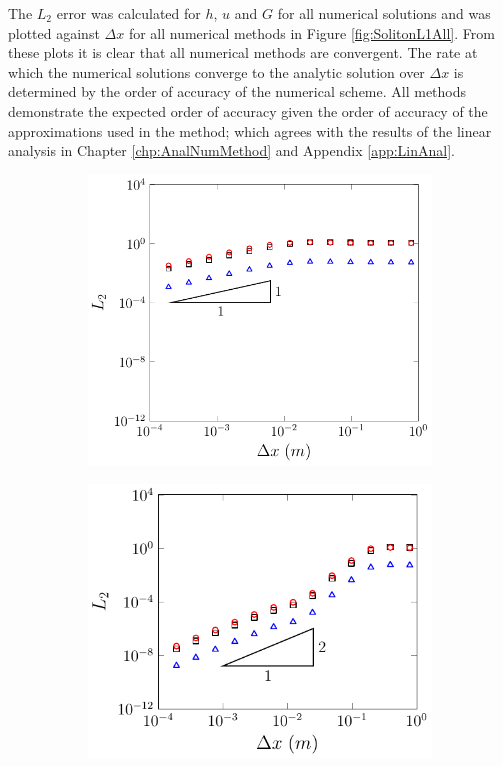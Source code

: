 The $L_2$ error was calculated for $h$, $u$ and $G$ for all numerical solutions and was plotted against $\Delta x$ for all numerical methods in Figure \ref{fig:SolitonL1All}. From these plots it is clear that all numerical methods are convergent. The rate at which the numerical solutions converge to the analytic solution over $\Delta x$ is determined by the order of accuracy of the numerical scheme. All methods demonstrate the expected order of accuracy given the order of accuracy of the approximations used in the method; which agrees with the results of the linear analysis in Chapter \ref{chp:AnalNumMethod} and Appendix \ref{app:LinAnal}.  

\begin{figure}
	\centering
	\begin{subfigure}{0.5\textwidth}
		\includegraphics[width=\textwidth]{./chp5/figures/Analytic/Soliton/L2/FDVM1.pdf}
		\vspace{0.5cm}
	\end{subfigure}%
	\begin{subfigure}{0.5\textwidth}
		\includegraphics[width=\textwidth]{./chp5/figures/Analytic/Soliton/L2/FDVM2.pdf}

\end{subfigure}
\end{figure}
